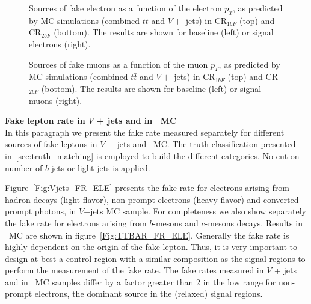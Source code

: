 \begin{figure}[h!]
\centering
{}
\caption
{Sources of fake electron as a function of the electron $p_T$, as predicted by MC simulations (combined $t\bar t$ and $V+$ jets) in CR$_{1bF}$ (top) and CR$_{2bF}$ (bottom). The results are shown for baseline (left) or signal electrons (right).} 
\label{Fig:truthComposition_ELFR_CR}
\end{figure}
\begin{figure}[h!]
\centering
{}
\caption
{Sources of fake muons as a function of the muon $p_T$, as predicted by MC simulations (combined $t\bar t$ and $V+$ jets) in CR$_{1bF}$ (top) and CR$_{2bF}$ (bottom). The results are shown for baseline (left) or signal muons (right).} 
\label{Fig:truthComposition_MUFR_CR}  
\end{figure}


\par{\bf Fake lepton rate in $V$ + jets and in \ttbar\ MC\\}
In this paragraph we present the fake rate measured separately for different sources of fake leptons in $V$ + jets and \ttbar\ MC. 
The truth classification presented in~\ref{sec:truth_matching} is employed to build the different categories. No cut on number of $b$-jets or light jets is applied.

Figure~\ref{Fig:Vjets_FR_ELE} presents the fake rate for electrons arising from hadron decays (light flavor), 
non-prompt electrons (heavy flavor) and converted prompt photons, in $V$+jets MC sample. 
For completeness we also show separately the fake rate for electrons arising from $b$-mesons and $c$-mesons decays. 
Results in \ttbar\ MC are shown in figure~\ref{Fig:TTBAR_FR_ELE}. 
Generally the fake rate is highly dependent on the origin of the fake lepton. 
Thus, it is very important to design at best a control region with a similar composition as the signal regions 
to perform the measurement of the fake rate. 
The fake rates measured in $V$ + jets and in \ttbar\ MC samples differ by a factor greater than 2 in the low \pt range 
for non-prompt electrons, the dominant source in the (relaxed) signal regions.

